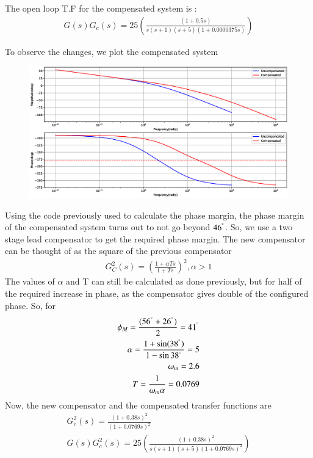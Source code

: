 The open loop T.F for the compensated system is  :
\begin{align}
    G(s) G_{c}(s) = 25\left(\frac{(1+0.5s)}{s(s+1)(s+5)(1+0.0000375s)}\right)
\end{align}


To observe the changes, we plot the compensated system

\begin{figure}[!ht]
    \centering
    \includegraphics[width=\columnwidth]{./figs/ee18btech11051/ee18btech11051_fig2.eps}
    \label{fig:ee18btech11051_2}
\end{figure}

Using the code previously used to calculate the phase margin, the phase margin of the compensated system turns out to not go beyond $46^{\degree}$. So, we use a two stage lead compensator to get the required phase margin. The new compensator can be thought of as the square of the previous compensator 
\begin{align}
    G_{C}^{2}(s) = \left(\frac{1+\alpha Ts} {1+Ts}\right)^{2}, \alpha >1
\end{align}
The values of $\alpha$ and T can still be calculated as done previously, but for half of the required increase in phase, as the compensator gives double of the configured phase. So, for
\begin{align}
    \phi_{M} = \frac{(56^{\degree}+26^{\degree})}{2} = 41^{\degree}\\
    \alpha = \frac{1+\sin(38^{\degree})}{1-\sin{38^{\degree}}} = 5\\
    \omega_{m} = 2.6\\
    T = \frac{1}{\omega_{m}\alpha} = 0.0769
\end{align}
Now, the new compensator and the compensated transfer functions are
\begin{align}
    G_{c}^{2}(s) = \frac{(1 + 0.38s)^{2}}{(1 + 0.0769s)^{2}}\\
    G(s) G_{c}^{2}(s) = 25\left(\frac{(1+0.38s)^{2}}{s(s+1)(s+5)(1+0.0769s)^{2}}\right)
\end{align}


